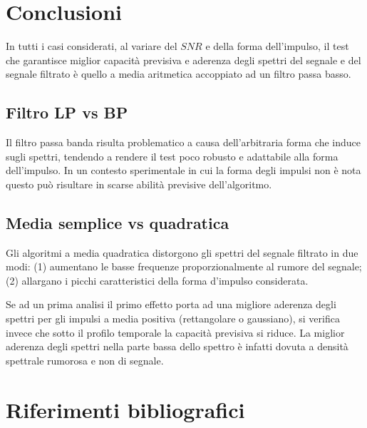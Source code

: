 \documentclass[9pt,twocolumn,twoside]{osajnl}
\begin{document}
\section{Conclusioni}
\label{conclusioni}

In tutti i casi considerati, al variare del $SNR$ e della forma dell'impulso, il test che garantisce miglior capacità previsiva e aderenza degli spettri del segnale e del segnale filtrato è quello a media aritmetica accoppiato ad un filtro passa basso.

\subsection{Filtro LP vs BP}
Il filtro passa banda risulta problematico a causa dell'arbitraria forma che induce sugli spettri, tendendo a rendere il test poco robusto e adattabile alla forma dell'impulso. In un contesto sperimentale in cui la forma degli impulsi non è nota questo può risultare in scarse abilità previsive dell'algoritmo.

\subsection{Media semplice vs quadratica}
Gli algoritmi a media quadratica distorgono gli spettri del segnale filtrato in due modi: (1) aumentano le basse frequenze proporzionalmente al rumore del segnale; (2) allargano i picchi caratteristici della forma d'impulso considerata.

Se ad un prima analisi il primo effetto porta ad una migliore aderenza degli spettri per gli impulsi a media positiva (rettangolare o gaussiano), si verifica invece che sotto il profilo temporale la capacità previsiva si riduce. La miglior aderenza degli spettri nella parte bassa dello spettro è infatti dovuta a densità spettrale rumorosa e non di segnale.


\section{Riferimenti bibliografici}


\end{document}
